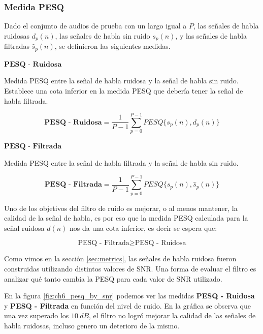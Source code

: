 \subsubsection{Medida PESQ}

Dado el conjunto de audios de prueba con un largo igual a $P$, las señales de habla ruidosas $d_p(n)$, las señales de habla sin ruido $s_p(n)$, y las señales de habla filtradas $\hat{s}_p(n)$, se definieron las siguientes medidas.

\vspace{5mm}

\noindent $\textbf{PESQ - Ruidosa}$

\vspace{5mm}

Medida PESQ entre la señal de habla ruidosa y la señal de habla sin ruido. Establece una cota inferior en la medida PESQ que debería tener la señal de habla filtrada.

\begin{equation*}
	\textbf{PESQ - Ruidosa} = \frac{1}{P-1} \sum_{p=0}^{P-1} PESQ\{ s_p(n), d_p(n) \}
\end{equation*}

\noindent $\textbf{PESQ - Filtrada}$ 

\vspace{5mm}

Medida PESQ entre la señal de habla filtrada y la señal de habla sin ruido. 

\begin{equation*}
	\textbf{PESQ - Filtrada} = \frac{1}{P-1} \sum_{p=0}^{P-1} PESQ\{ s_p(n), \hat{s}_p(n) \}
\end{equation*}

Uno de los objetivos del filtro de ruido es mejorar, o al menos mantener, la calidad de la señal de habla, es por eso que la medida PESQ calculada para la señal ruidosa $d(n)$ nos da una cota inferior, es decir se espera que:

\begin{equation*}
	\text{PESQ - Filtrada} \geq \text{PESQ - Ruidosa}
\end{equation*}

Como vimos en la sección \ref{sec:metrics}, las señales de habla ruidosa fueron construidas utilizando distintos valores de SNR. Una forma de evaluar el filtro es analizar qué tanto cambia la PESQ para cada valor de SNR utilizado.

En la figura \ref{fig:ch6_pesq_by_snr} podemos ver las medidas \textbf{PESQ - Ruidosa} y \textbf{PESQ - Filtrada} en función del nivel de ruido. En la gráfica se observa que una vez superado los $\SI{10}{dB}$, el filtro no logró mejorar la calidad de las señales de habla ruidosas, incluso genero un deterioro de la mismo.

